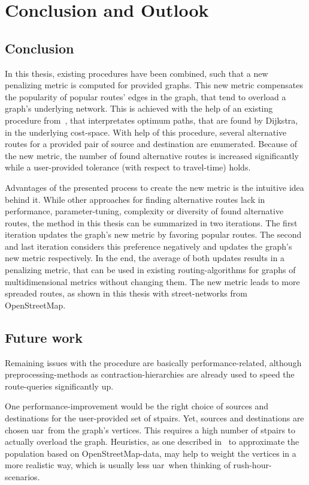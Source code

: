 \chapter{Conclusion and Outlook}
\label{chap:conclusion}

\section{Conclusion}

    In this thesis, existing procedures have been combined, such that a new penalizing metric is computed for provided graphs.
    This new metric compensates the popularity of popular routes' edges in the graph, that tend to overload a graph's underlying network.
    This is achieved with the help of an existing procedure from~\cite{barth:alternative_multicriteria_routes}, that interpretates optimum paths, that are found by Dijkstra, in the underlying cost-space.
    With help of this procedure, several alternative routes for a provided pair of source and destination are enumerated.
    Because of the new metric, the number of found alternative routes is increased significantly while a user-provided tolerance (with respect to travel-time) holds.

    Advantages of the presented process to create the new metric is the intuitive idea behind it.
    While other approaches for finding alternative routes lack in performance, parameter-tuning, complexity or diversity of found alternative routes, the method in this thesis can be summarized in two iterations.
    The first iteration updates the graph's new metric by favoring popular routes.
    The second and last iteration considers this preference negatively and updates the graph's new metric respectively.
    In the end, the average of both updates results in a penalizing metric, that can be used in existing routing-algorithms for graphs of multidimensional metrics without changing them.
    The new metric leads to more spreaded routes, as shown in this thesis with street-networks from OpenStreetMap.

\section{Future work}

    Remaining issues with the procedure are basically performance-related, although preprocessing-methods as contraction-hierarchies are already used to speed the route-queries significantly up.

    One performance-improvement would be the right choice of sources and destinations for the user-provided set of \glspl{stpair}.
    Yet, sources and destinations are chosen \gls{uar}\ from the graph's vertices.
    This requires a high number of \glspl{stpair} to actually overload the graph.
    Heuristics, as one described in~\cite{bakillah:population_from_osm} to approximate the population based on OpenStreetMap-data, may help to weight the vertices in a more realistic way, which is usually less \gls{uar}\ when thinking of rush-hour-scenarios.

